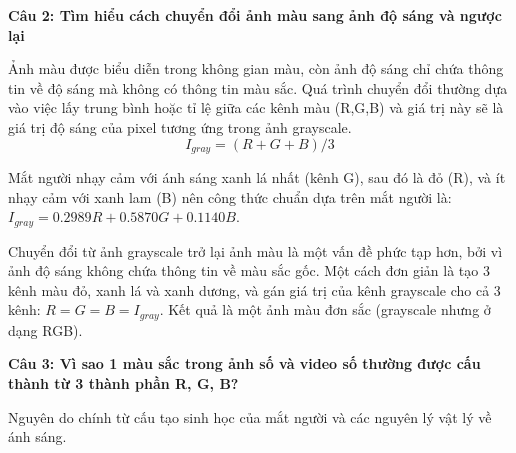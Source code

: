 \textbf{Câu 2: Tìm hiểu cách chuyển đổi ảnh màu sang ảnh độ sáng và ngược lại}

Ảnh màu được biểu diễn trong không gian màu, còn ảnh độ sáng chỉ chứa thông tin về độ sáng mà không có thông tin màu sắc. Quá trình chuyển đổi thường dựa vào việc lấy trung bình hoặc tỉ lệ giữa các kênh màu (R,G,B) và giá trị này sẽ là giá trị độ sáng của pixel tương ứng trong ảnh grayscale.
\[I_{gray} = (R + G + B) / 3\]

Mắt người nhạy cảm với ánh sáng xanh lá nhất (kênh G), sau đó là đỏ (R), và ít nhạy cảm với xanh lam (B) nên công thức chuẩn dựa trên mắt người là: $I_{gray} = 0.2989R + 0.5870G + 0.1140B$.

Chuyển đổi từ ảnh grayscale trở lại ảnh màu là một vấn đề phức tạp hơn, bởi vì ảnh độ sáng không chứa thông tin về màu sắc gốc. Một cách đơn giản là tạo 3 kênh màu đỏ, xanh lá và xanh dương, và gán giá trị của kênh grayscale cho cả 3 kênh: $R = G = B = I_{gray}$. Kết quả là một ảnh màu đơn sắc (grayscale nhưng ở dạng RGB).

\textbf{Câu 3: Vì sao 1 màu sắc trong ảnh số và video số thường được cấu thành từ 3 thành phần R, G, B?}

Nguyên do chính từ cấu tạo sinh học của mắt người và các nguyên lý vật lý về ánh sáng.


